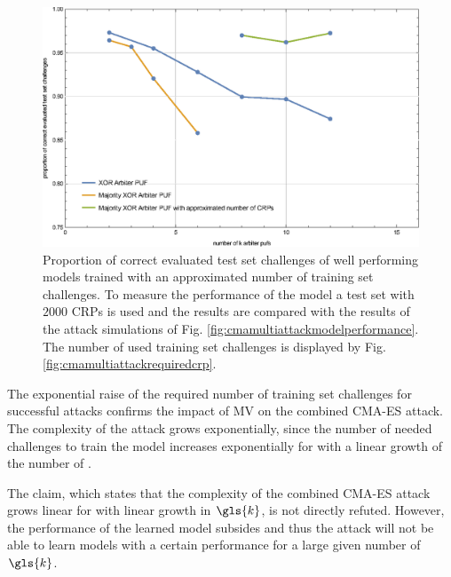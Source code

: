 \begin{figure}[ht]
\includegraphics[width=1.00\textwidth]{images/xor-cma-attack-approx.eps}
\caption[Proportion of correct evaluated test set challenges for Majority \acs{XOR} \pufs with approximated required number of training set challenges]{Proportion of correct evaluated test set challenges of well performing models trained with an approximated number of training set challenges. To measure the performance of the model a test set with $2000$ \acp{CRP} is used and the results are compared with the results of the attack simulations of Fig. \ref{fig:cmamultiattackmodelperformance}. The number of used training set challenges is displayed by Fig. \ref{fig:cmamultiattackrequiredcrp}.}
\label{fig:cmamultiattackmvmodelperformance}
\end{figure}

The exponential raise of the required number of training set challenges for successful attacks confirms the impact of \ac{MV} on the combined \ac{CMA-ES} attack.
The complexity of the attack grows exponentially, since the number of needed challenges to train the model increases exponentially for \mxpufs with a linear growth of the number of \mpufs.

The claim, which states that the complexity of the combined \ac{CMA-ES} attack grows linear for \xpufs with linear growth in $\gls{k}$, is not directly refuted.
However, the performance of the learned model subsides and thus the attack will not be able to learn models with a certain performance for a large given number of $\gls{k}$.

